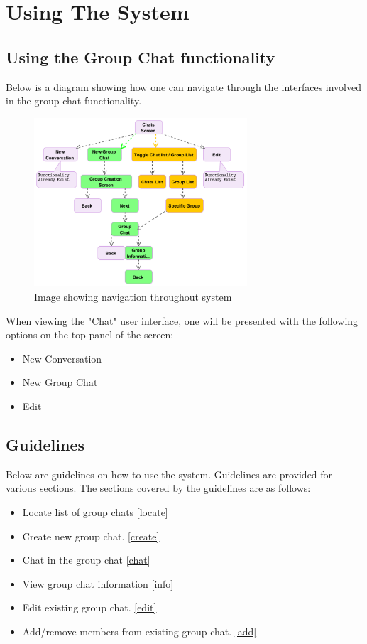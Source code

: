 \documentclass[11pt]{article}
\begin{document}
\section{Using The System}
\subsection*{Using the Group Chat functionality}
Below is a diagram showing how one can navigate through the interfaces involved in the group chat functionality. \\
\begin{figure}[H]
\includegraphics[width=300px]{./images/flow.png}
 \caption{Image showing navigation throughout system}
 \label{flow}
 \end{figure}

When viewing the "Chat" user interface, one will be presented with the following options on the top panel of the screen:
\begin{itemize}
\item New Conversation
\item New Group Chat
\item Edit
\end{itemize}

\subsection{Guidelines}
Below are guidelines on how to use the system. Guidelines are provided for various sections. The sections covered by the guidelines are as follows:
\begin{itemize}
\item Locate list of group chats \ref{locate}
\item Create new group chat. \ref{create}
\item Chat in the group chat \ref{chat}
\item View group chat information \ref{info}
\item Edit existing group chat. \ref{edit}
\item Add/remove members from existing group chat. \ref{add}
\end{itemize}
\end{document}
